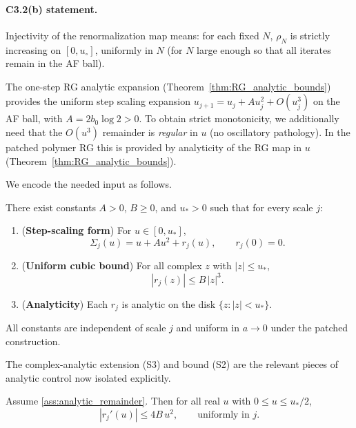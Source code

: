 \paragraph{C3.2(b) statement.}
Injectivity of the renormalization map means: for each fixed $N$, $\rho_N$ is strictly increasing on $[0,u_\circ]$,
uniformly in $N$ (for $N$ large enough so that all iterates remain in the AF ball).

The one-step RG analytic expansion (Theorem~\ref{thm:RG_analytic_bounds}) provides the uniform step scaling expansion
$u_{j+1}=u_j + A u_j^2 + O(u_j^3)$ on the AF ball, with $A=2b_0\log 2>0$.
To obtain strict monotonicity, we additionally need that the $O(u^3)$ remainder is \emph{regular} in $u$ (no oscillatory pathology).
In the patched polymer RG this is provided by analyticity of the RG map in $u$ (Theorem~\ref{thm:RG_analytic_bounds}).

We encode the needed input as follows.

\begin{proposition}\label{ass:analytic_remainder}
There exist constants $A>0$, $B\ge 0$, and $u_\ast>0$ such that for every scale $j$:
\begin{enumerate}[label=(S\arabic*)]
\item (\textbf{Step-scaling form}) For $u\in[0,u_\ast]$,
\begin{equation}\label{eq:Sigma}
\Sigma_j(u)=u + A u^2 + r_j(u),
\qquad r_j(0)=0.
\end{equation}
\item (\textbf{Uniform cubic bound}) For all complex $z$ with $|z|\le u_\ast$,
\begin{equation}\label{eq:r_bound}
|r_j(z)|\le B\,|z|^3.
\end{equation}
\item (\textbf{Analyticity}) Each $r_j$ is analytic on the disk $\{z:|z|<u_\ast\}$.
\end{enumerate}
All constants are independent of scale $j$ and uniform in $a\to 0$ under the patched construction.
\end{proposition}

The complex-analytic extension (S3) and bound (S2) are the relevant pieces of analytic control now isolated explicitly.

\begin{lemma}\label{lem:rprime}
Assume \ref{ass:analytic_remainder}.
Then for all real $u$ with $0\le u\le u_\ast/2$,
\begin{equation}\label{eq:rprime_bound}
|r_j'(u)|\le 4B\,u^2,
\qquad\text{uniformly in }j.
\end{equation}
\end{lemma}

